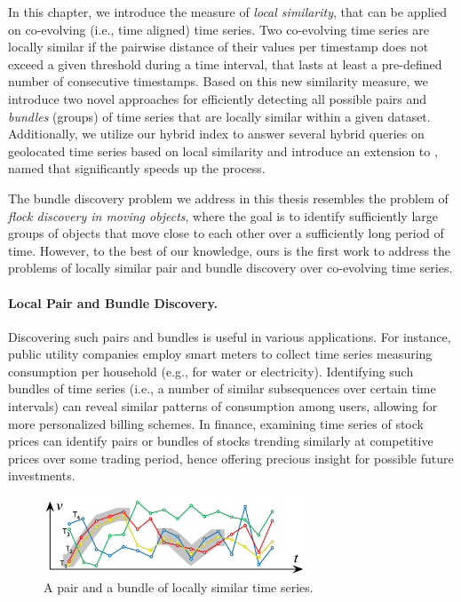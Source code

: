 
\graphicspath{{Papers/SSTD2019/}{Papers/SIGSpatial2019/}}

In this chapter, we introduce the measure of \textit{local similarity}, that can be applied on co-evolving (i.e., time aligned) time series. Two co-evolving time series are locally similar if the pairwise distance of their values per timestamp does not exceed a given threshold during a time interval, that lasts at least a pre-defined number of consecutive timestamps. Based on this new similarity measure, we introduce two novel approaches for efficiently detecting all possible pairs and \textit{bundles} (groups) of time series that are locally similar within a given dataset. Additionally, we utilize our hybrid \btsr index to answer several hybrid queries on geolocated time series based on local similarity and introduce an extension to \btsr, named \sbtsr that significantly speeds up the process.

The bundle discovery problem we address in this thesis resembles the problem of \textit{flock discovery in moving objects}, where the goal is to identify sufficiently large groups of objects that move close to each other over a sufficiently long period of time. However, to the best of our knowledge, ours is the first work to address the problems of locally similar pair and bundle discovery over co-evolving time series. 

\paragraph{Local Pair and Bundle Discovery.} Discovering such pairs and bundles is useful in various applications. For instance, public utility companies employ smart meters to collect time series measuring consumption per household (e.g., for water or electricity). Identifying such bundles of time series (i.e., a number of similar subsequences over certain time intervals) can reveal similar patterns of consumption among users, allowing for more personalized billing schemes. In finance, examining time series of stock prices can identify pairs or bundles of stocks trending similarly at competitive prices over some trading period, hence offering precious insight for possible future investments.

\begin{figure}[!tb]
    \centering
    \includegraphics[width=0.7\textwidth]{figures/pair_flock_ex.png}
    \caption{A pair and a bundle of locally similar time series.}
    \label{fig:pair_flock_ex}
\end{figure}

